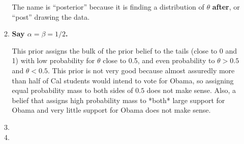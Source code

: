 \documentclass{article}[12pt]
\begin{document}
\begin{enumerate}
\begin{enumerate}[(1)]
	The name is ``posterior'' because it is finding a distribution of $\theta$ \textbf{after}, or ``post'' drawing the data.

	\item \textbf{Say $\alpha = \beta = 1/2$.}
	
	This prior assigns the bulk of the prior belief to the tails (close to 0 and 1) with low probability for $\theta$ close to 0.5, and even probability to $\theta > 0.5$ and $\theta < 0.5$. This prior is not very good because almost assuredly more than half of Cal students would intend to vote for Obama, so assigning equal probability mass to both sides of $0.5$ does not make sense. Also, a belief that assigns high probability mass to *both* large support for Obama and very little support for Obama does not make sense.

	\item 

	\item 
	\end{enumerate}

\end{enumerate}
\end{document}
